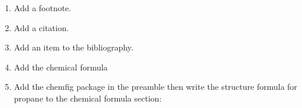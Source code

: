 \documentclass[12pt,a4paper]{article} %
\begin{document}
\begin{enumerate}
	\item Add a footnote.
	\item Add a citation.
	\item Add an item to the bibliography.
	\item Add the chemical formula
		\begin{center}
	\end{center}
	\item Add the chemfig package in the preamble then write the structure formula for propane to the chemical formula section:
		\begin{center}
	\end{center}
\end{enumerate}
\end{document}

